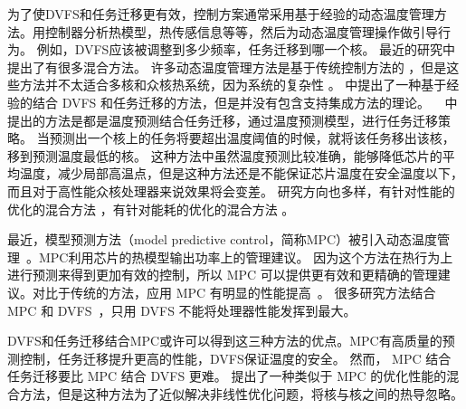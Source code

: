  为了使DVFS和任务迁移更有效，控制方案通常采用基于经验的动态温度管理方法。用控制器分析热模型，热传感信息等等，然后为动态温度管理操作做引导行为。
 例如，DVFS应该被调整到多少频率，任务迁移到哪一个核。
 最近的研究中提出了有很多混合方法。
 许多动态温度管理方法是基于传统控制方法的 ，但是这些方法并不太适合多核和众核热系统，因为系统的复杂性 。 
 \cite{Brooks:HPCA'04}中提出了一种基于经验的结合 DVFS 和任务迁移的方法，但是并没有包含支持集成方法的理论。
 ~\cite{yeo2008predictive,coskun2008proactive} 中提出的方法是都是温度预测结合任务迁移，通过温度预测模型，进行任务迁移策略。
 当预测出一个核上的任务将要超出温度阈值的时候，就将该任务移出该核，移到预测温度最低的核。
 这种方法中虽然温度预测比较准确，能够降低芯片的平均温度，减少局部高温点，但是这种方法还是不能保证芯片温度在安全温度以下，而且对于高性能众核处理器来说效果将会变差。
 研究方向也多样，有针对性能的优化的混合方法 ，有针对能耗的优化的混合方法 。
 
 最近，模型预测方法（model predictive control，简称MPC）被引入动态温度管理~。MPC利用芯片的热模型输出功率上的管理建议。
 因为这个方法在热行为上进行预测来得到更加有效的控制，所以 MPC 可以提供更有效和更精确的管理建议。对比于传统的方法，应用 MPC 有明显的性能提高~。
 很多研究方法结合 MPC 和 DVFS~，只用 DVFS 不能将处理器性能发挥到最大。
 
 DVFS和任务迁移结合MPC或许可以得到这三种方法的优点。MPC有高质量的预测控制，任务迁移提升更高的性能，DVFS保证温度的安全。
 然而， MPC 结合任务迁移要比 MPC 结合 DVFS 更难。
 \cite{Hanumaiah:TCAD'11} 提出了一种类似于 MPC 的优化性能的混合方法，但是这种方法为了近似解决非线性优化问题，将核与核之间的热导忽略。
 
